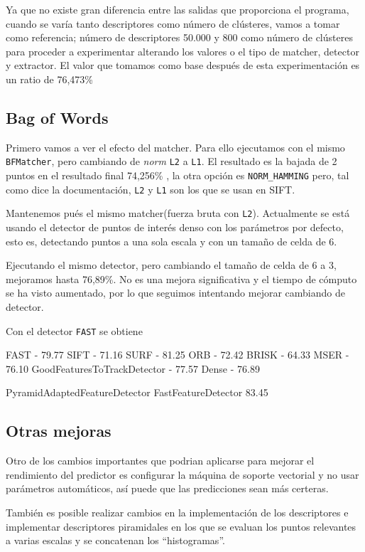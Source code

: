 \documentclass[a4paper,12pt]{article}
\begin{document}
Ya que no existe gran diferencia entre las salidas que proporciona el programa,
cuando se varía tanto descriptores como número de clústeres, vamos a tomar como
referencia; número de descriptores 50.000 y 800 como número de clústeres para
proceder a experimentar alterando los valores o el tipo de matcher, detector y
extractor. El valor que tomamos como base después de esta experimentación es
un ratio de 76,473\%

\subsection{Bag of Words}

Primero vamos a ver el efecto del matcher. Para ello ejecutamos con el mismo
\texttt{BFMatcher}, pero cambiando de \emph{norm} \texttt{L2} a \texttt{L1}. El resultado es la bajada de
2 puntos en el resultado final 74,256\% , la otra opción es \texttt{NORM\_HAMMING}
pero, tal como dice la documentación, \texttt{L2} y \texttt{L1} son los que se usan en SIFT.

Mantenemos pués el mismo matcher(fuerza bruta con \texttt{L2}).
Actualmente se está usando el detector de puntos de interés denso con los 
parámetros por defecto, esto es, detectando puntos a una sola escala y con un
tamaño de celda de 6. 

Ejecutando el mismo detector, pero cambiando el tamaño de  celda de 6 a 3, 
mejoramos hasta 76,89\%. No es una mejora significativa y el tiempo
de cómputo se ha visto aumentado, por lo que seguimos intentando mejorar 
cambiando de detector. 

Con el detector \texttt{FAST} se obtiene

FAST - 79.77
SIFT - 71.16
SURF - 81.25
ORB - 72.42
BRISK - 64.33
MSER - 76.10
GoodFeaturesToTrackDetector - 77.57
Dense - 76.89

PyramidAdaptedFeatureDetector FastFeatureDetector 83.45

\subsection{Otras mejoras}

Otro de los cambios importantes que podrian aplicarse para mejorar el 
rendimiento del predictor es configurar la máquina de soporte vectorial y no 
usar parámetros automáticos, así puede que las predicciones sean más certeras.

También es posible realizar cambios en la implementación de los descriptores e 
implementar descriptores piramidales en los que se evaluan los puntos relevantes
a varias escalas y se concatenan los ``histogramas''.
\end{document}
